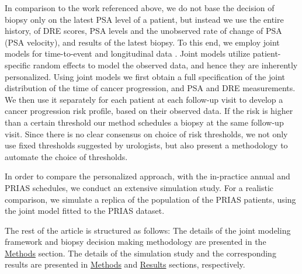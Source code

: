 In comparison to the work referenced above, we do not base the decision of biopsy only on the latest PSA level of a patient, but instead we use the entire history, of DRE scores, PSA levels and the unobserved rate of change of PSA (PSA velocity), and results of the latest biopsy. To this end, we employ joint models for time-to-event and longitudinal data \cite{tsiatis2004joint,rizopoulos2012joint}. Joint models utilize patient-specific random effects \cite{laird1982random} to model the observed data, and hence they are inherently personalized. Using joint models we first obtain a full specification of the joint distribution of the time of cancer progression, and PSA and DRE measurements. We then use it separately for each patient at each follow-up visit to develop a cancer progression risk profile, based on their observed data. If the risk is higher than a certain threshold our method schedules a biopsy at the same follow-up visit. Since there is no clear consensus on choice of risk thresholds, we not only use fixed thresholds suggested by urologists, but also present a methodology to automate the choice of thresholds. 

In order to compare the personalized approach, with the in-practice annual and PRIAS schedules, we conduct an extensive simulation study. For a realistic comparison, we simulate a replica of the population of the PRIAS patients, using the joint model fitted to the PRIAS dataset.

The rest of the article is structured as follows: The details of the joint modeling framework and biopsy decision making methodology are presented in the \hyperref[sec:methods]{Methods} section. The details of the simulation study and the corresponding results are presented in \hyperref[sec:methods]{Methods} and \hyperref[sec:results]{Results} sections, respectively.